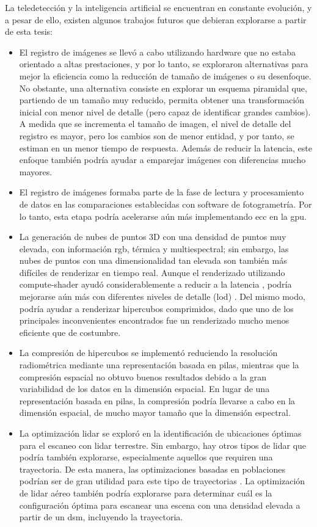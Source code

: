La teledetección y la inteligencia artificial se encuentran en constante evolución, y a pesar de ello, existen algunos trabajos futuros que debieran explorarse a partir de esta tesis:
\begin{itemize}
    \item El registro de imágenes se llevó a cabo utilizando hardware que no estaba orientado a altas prestaciones, y por lo tanto, se exploraron alternativas para mejor la eficiencia como la reducción de tamaño de imágenes o su desenfoque. No obstante, una alternativa consiste en explorar un esquema piramidal que, partiendo de un tamaño muy reducido, permita obtener una transformación inicial con menor nivel de detalle (pero capaz de identificar grandes cambios). A medida que se incrementa el tamaño de imagen, el nivel de detalle del registro es mayor, pero los cambios son de menor entidad, y por tanto, se estiman en un menor tiempo de respuesta.  Además de reducir la latencia, este enfoque también podría ayudar a emparejar imágenes con diferencias mucho mayores.
    \item El registro de imágenes formaba parte de la fase de lectura y procesamiento de datos en las comparaciones establecidas con software de fotogrametría. Por lo tanto, esta etapa podría acelerarse aún más implementando \acrshort{ecc} en la \acrshort{gpu}.
    \item La generación de nubes de puntos 3D con una densidad de puntos muy elevada, con información \acrshort{rgb}, térmica y multiespectral; sin embargo, las nubes de puntos con una dimensionalidad tan elevada son también más difíciles de renderizar en tiempo real. Aunque el renderizado utilizando compute-shader ayudó considerablemente a reducir a la latencia \cite{schutz_rendering_2021}, podría mejorarse aún más con diferentes niveles de detalle (\acrshort{lod}) \cite{schutz_gpu-accelerated_2023}. Del mismo modo, podría ayudar a renderizar hipercubos comprimidos, dado que uno de los principales inconvenientes encontrados fue un renderizado mucho menos eficiente que de costumbre.
    \item La compresión de hipercubos se implementó reduciendo la resolución radiométrica mediante una representación basada en pilas, mientras que la compresión espacial no obtuvo buenos resultados debido a la gran variabilidad de los datos en la dimensión espacial. En lugar de una representación basada en pilas, la compresión podría llevarse a cabo en la dimensión espacial, de mucho mayor tamaño que la dimensión espectral. 
    \item La optimización \acrshort{lidar} se exploró en la identificación de ubicaciones óptimas para el escaneo con \acrshort{lidar} terrestre. Sin embargo, hay otros tipos de \acrshort{lidar} que podría también explorarse, especialmente aquellos que requiren una trayectoria. De esta manera, las optimizaciones basadas en poblaciones podrían ser de gran utilidad para este tipo de trayectorias \cite{roberge_fast_2018}. La optimización de \acrshort{lidar} aéreo también podría explorarse para determinar cuál es la configuración óptima para escanear  una escena con una densidad elevada a partir de un \acrshort{dsm}, incluyendo la trayectoria.

\end{itemize}
